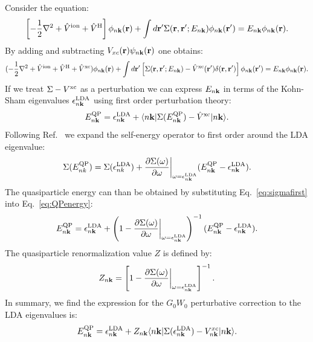 Consider the equation:
%
\begin{equation}
\label{eq:qpeq2}
\left[-\frac{1}{2}\nabla^{2} + \hat{V}^{\rm{ion}} + \hat{V}^{\rm{H}}\right]\phi_{n{\bf k}}({\bf r}) + \int{d}{\bf r}' \Sigma({\bf r},{\bf r}';E_{n{\bf k}})\phi_{n{\bf k}}({\bf r}')=E_{n{\bf k}}\phi_{n{\bf k}}({\bf r}).
\end{equation}
%
By adding and subtracting $V_{xc}({\bf r})\psi_{n{\bf k}}({\bf r})$ one obtains:
%
\begin{equation}
(-\frac{1}{2}\nabla^{2} + \hat{V}^{\rm{ion}} + \hat{V}^{\rm{H}} + \hat{V}^{\rm{xc}})\phi_{n{\bf k}}({\bf r}) + \int{d}{\bf r}' \left[\Sigma({\bf r},{\bf r}';E_{n{\bf k}})-\hat{V}^{\rm{xc}}({\bf r}')\delta({\bf r},{\bf r}')\right]\phi_{n{\bf k}}({\bf r}') = E_{n{\bf k}}\phi_{n{\bf k}}({\bf r}).
\end{equation}
%
If we treat $\Sigma-V^{\rm{xc}}$ as a perturbation we can express $E_{n{\bf k}}$
in terms of the Kohn-Sham eigenvalues $\epsilon^{\rm{LDA}}_{n{\bf k}}$ using 
first order perturbation theory:
%
\begin{equation}
\label{eq:QPenergy}
E_{n{\bf k}}^{\rm{QP}} = \epsilon_{n{\bf k}}^{\rm{LDA}} + \langle n{\bf k}| \Sigma(E_{n{\bf k}}^{\rm{QP}}) - \hat{V}^{\rm{xc}}|n{\bf k}\rangle.
\end{equation}
%
Following Ref.~\cite{HL86} we expand the self-energy operator to first order around the LDA eigenvalue:
%
\begin{equation}
\label{eq:sigmafirst}
\Sigma( E_{nk}^{\rm{QP}} ) = \Sigma(\epsilon_{nk}^{\rm{LDA}}) + \frac{\partial\Sigma(\omega)}{\partial \omega}\bigg|_{\omega = \epsilon_{n{\bf k}}^{\rm{LDA}}}(E_{n{\bf k}}^{\rm{QP}} - \epsilon_{n{\bf k}}^{\rm{LDA}}). 
\end{equation}
%
The quasiparticle energy can than be obtained by substituting Eq.~\ref{eq:sigmafirst} into Eq.~\ref{eq:QPenergy}:
%
\begin{equation}
\label{eq:QPfirst}
E_{n{\bf k}}^{\rm{QP}} = \epsilon_{n{\bf k}}^{\rm{LDA}} + \left(1-\frac{\partial\Sigma(\omega)}{\partial \omega}\bigg|_{\omega=\epsilon_{n{\bf k}}^{\rm{LDA}}}\right)^{-1}(E_{n{\bf k}}^{\rm{QP}} - \epsilon_{n{\bf k}}^{\rm{LDA}}). 
\end{equation}
%
The quasiparticle renormalization value $Z$ is defined by:
%
\begin{equation}
Z_{n{\bf k}} =  \left[1-\frac{\partial\Sigma(\omega)}{\partial \omega}\bigg|_{\omega = \epsilon_{n{\bf k}}^{\rm{LDA}}}\right]^{-1}.
\end{equation}
%
In summary, we find the expression for the $G_{0}W_{0}$ perturbative correction to the LDA eigenvalues is:
%
\begin{equation}
\label{eq:qpcorrpert}
E^{\rm{QP}}_{n{\bf k}} =  \epsilon^{\rm{LDA}}_{n{\bf k}} + Z_{n{\bf k}}\langle n{\bf k}|\Sigma(\epsilon^{\rm{LDA}}_{n{\bf k}})-V^{xc}_{n{\bf k}}| n{\bf k}\rangle.
\end{equation}
%

